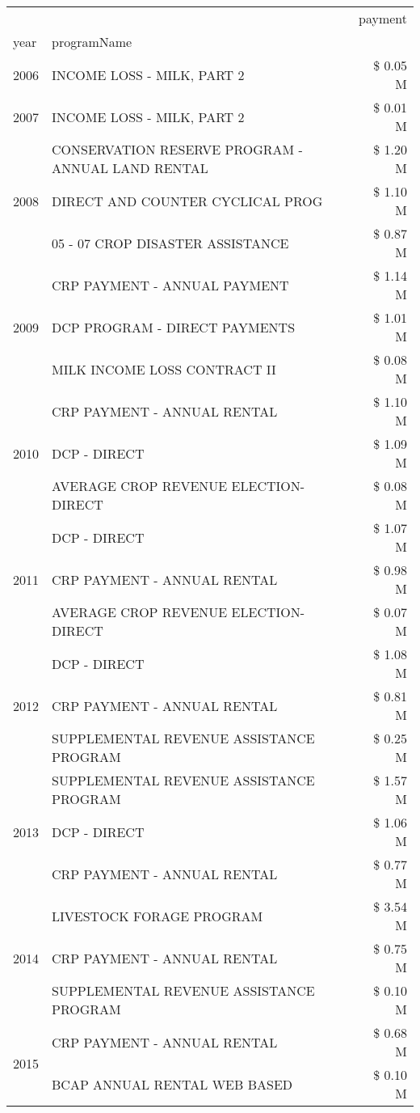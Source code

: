 \begin{tabular}{llr}
\toprule
 &  & payment \\
year & programName &  \\
\midrule
2006 & INCOME LOSS - MILK, PART 2 & \$ 0.05 M \\
\cline{1-3}
2007 & INCOME LOSS - MILK, PART 2 & \$ 0.01 M \\
\cline{1-3}
\multirow[t]{3}{*}{2008} & CONSERVATION RESERVE PROGRAM - ANNUAL LAND RENTAL & \$ 1.20 M \\
 & DIRECT AND COUNTER CYCLICAL PROG & \$ 1.10 M \\
 & 05 - 07 CROP DISASTER ASSISTANCE & \$ 0.87 M \\
\cline{1-3}
\multirow[t]{3}{*}{2009} & CRP PAYMENT - ANNUAL PAYMENT & \$ 1.14 M \\
 & DCP PROGRAM - DIRECT PAYMENTS & \$ 1.01 M \\
 & MILK INCOME LOSS CONTRACT II & \$ 0.08 M \\
\cline{1-3}
\multirow[t]{3}{*}{2010} & CRP PAYMENT - ANNUAL RENTAL & \$ 1.10 M \\
 & DCP - DIRECT & \$ 1.09 M \\
 & AVERAGE CROP REVENUE ELECTION-DIRECT & \$ 0.08 M \\
\cline{1-3}
\multirow[t]{3}{*}{2011} & DCP - DIRECT & \$ 1.07 M \\
 & CRP PAYMENT - ANNUAL RENTAL & \$ 0.98 M \\
 & AVERAGE CROP REVENUE ELECTION-DIRECT & \$ 0.07 M \\
\cline{1-3}
\multirow[t]{3}{*}{2012} & DCP - DIRECT & \$ 1.08 M \\
 & CRP PAYMENT - ANNUAL RENTAL & \$ 0.81 M \\
 & SUPPLEMENTAL REVENUE ASSISTANCE PROGRAM & \$ 0.25 M \\
\cline{1-3}
\multirow[t]{3}{*}{2013} & SUPPLEMENTAL REVENUE ASSISTANCE PROGRAM & \$ 1.57 M \\
 & DCP - DIRECT & \$ 1.06 M \\
 & CRP PAYMENT - ANNUAL RENTAL & \$ 0.77 M \\
\cline{1-3}
\multirow[t]{3}{*}{2014} & LIVESTOCK FORAGE PROGRAM & \$ 3.54 M \\
 & CRP PAYMENT - ANNUAL RENTAL & \$ 0.75 M \\
 & SUPPLEMENTAL REVENUE ASSISTANCE PROGRAM & \$ 0.10 M \\
\cline{1-3}
\multirow[t]{3}{*}{2015} & CRP PAYMENT - ANNUAL RENTAL & \$ 0.68 M \\
 & BCAP ANNUAL RENTAL WEB BASED & \$ 0.10 M \\

\end{tabular}
